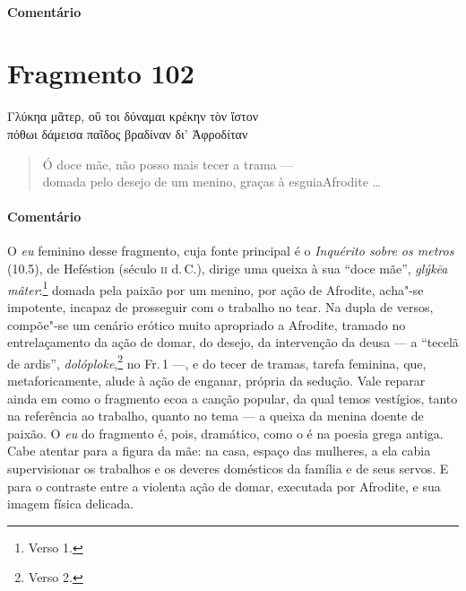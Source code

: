 \paragraph{Comentário} 



\section{Fragmento 102}

\begin{gkverse}
Γλύκηα μᾶτερ, οὔ τοι δύναμαι κρέκην τὸν ἴστον\\
πόθωι δάμεισα παῖδος βραδίναν δι’ Ἀφροδίταν
\end{gkverse}

\begin{verse}
Ó doce mãe, não posso mais tecer a trama --- \\
{domada pelo desejo de um menino, graças à esguia\qb{}Afrodite }\ldots{}
\end{verse}

\medskip

{\paragraph{Comentário} O \emph{eu} feminino desse fragmento, cuja fonte principal é o \emph{Inquérito
sobre os metros} (10.5), de Heféstion (século \textsc{ii} d.\,C.), dirige uma queixa à sua
``doce mãe'', \emph{glýkēa mâter}:\footnote{Verso 1.} domada pela paixão por um menino, por ação de Afrodite, acha"-se impotente, incapaz de prosseguir com o trabalho no tear. Na dupla de
versos, compõe"-se um cenário erótico muito apropriado a Afrodite, tramado no
entrelaçamento da ação de domar, do desejo, da intervenção da deusa
--- a ``tecelã de ardis'', \emph{dolóploke},\footnote{Verso 2.} no Fr.\,1 ---, e do tecer de tramas, tarefa feminina, que, metaforicamente, alude à ação de enganar, própria da sedução.
Vale reparar ainda em como o fragmento ecoa a canção popular, da qual
temos vestígios, tanto na referência ao trabalho, quanto no tema --- a queixa da
menina doente de paixão. O \emph{eu} do fragmento é, pois, dramático, como o é
na poesia grega antiga. Cabe atentar para a figura da mãe: na
casa, espaço das mulheres, a ela cabia supervisionar os trabalhos e os deveres
domésticos da família e de seus servos. E para o contraste entre a violenta
ação de domar, executada por Afrodite, e sua imagem física delicada.}



